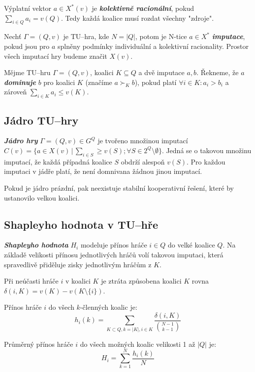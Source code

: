         Výplatní vektor $a \in X^*(v)$ je \textit{\textbf{kolektivně racionální}}, pokud $\sum_{i \in Q}a_i = v(Q)$. Tedy každá koalice musí rozdat všechny "zdroje".

        Nechť $\Gamma = (Q, v)$ je TU--hra, kde $N = |Q|$, potom je N-tice $a \in X^*$ \textit{\textbf{imputace}}, pokud jsou pro $a$ splněny podmínky individuální a kolektivní racionality. Prostor všech imputací hry budeme značit $X(v)$.

        Mějme TU--hru $\Gamma = (Q, v)$, koalici $K \subseteq Q$ a dvě imputace $a, b$. Řekneme, že $a$ \textit{\textbf{dominuje}} $b$ pro koalici $K$ (značíme $a \succ_K b$), pokud platí $\forall i \in K: a_i > b_i$ a zároveň $\sum_{i \in K}a_i \leq v(K)$.

    \subsection{Jádro TU--hry}
        \textit{\textbf{Jádro hry}} $\Gamma = (Q, v) \in G^Q$ je tvořeno množinou imputací $C(v) = \{a \in X(v)\,|\,\sum_{i \in S} \geq v(S); \forall S \in 2^Q \setminus \emptyset\}$. Jedná se o takovou množinu imputací, že každá případná koalice $S$ obdrží alespoň $v(S)$. Pro každou imputaci v jádře platí, že není domnivana žádnou jinou imputací.

        Pokud je jádro prázdní, pak neexistuje stabilní kooperativní řešení, které by ustanovilo velkou koalici.

    \subsection{Shapleyho hodnota v TU--hře}
        \textit{\textbf{Shapleyho hodnota}} \cite{Shapley1953} $H_i$ modeluje přínos hráče $i \in Q$ do velké koalice $Q$. Na základě velikosti přínosu jednotlivých hráčů volí takovou imputaci, která spravedlivě přiděluje zisky jednotlivým hráčům z $K$.

        Při neúčasti hráče $i$ v koalici $K$ je ztráta způsobena koalici $K$ rovna $\delta(i, K) = v(K) - v(K \setminus \{i\})$.

        Přínos hráče $i$ do všech $k$-členných koalic je:
        \vspace*{-0.3em}
        $$
        h_i(k) = \sum_{K \subset Q, k = |K|, i \in K}\frac{\delta(i, K)}{{{N-1} \choose {k-1}}}
        $$

        Průměrný přínos hráče $i$ do všech možných koalic velikosti 1 až $|Q|$ je:
        \vspace*{-0.3em}
        $$
        H_i = \sum^N_{k = 1}\frac{h_i(k)}{N}
        $$


